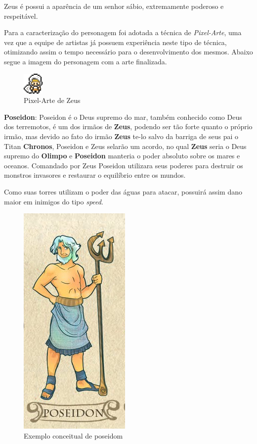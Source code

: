 \documentclass[11pt]{article} %
\begin{document}
Zeus é possui a aparência de um senhor sábio, extremamente poderoso e respeitável.

Para a caracterização do personagem foi adotada a técnica de \textit{Pixel-Arte}, uma vez que a equipe de artistas já possuem experiência neste tipo de técnica, otimizando  assim o tempo necessário para o desenvolvimento dos mesmos. Abaixo segue a imagem do personagem com a arte finalizada.

\begin{figure}[!htp]
\centering
\includegraphics[scale=2]{res/characters/zeus_panel.png}
\caption{Pixel-Arte de Zeus}
\label{zeus}
\end{figure}

\newpage

{\large \textbf{Poseidon}}: Poseidon é o Deus supremo do mar, também conhecido como Deus dos terremotos, é um dos irmãos de \textbf{Zeus}, podendo ser tão forte quanto o próprio irmão, mas devido ao fato do irmão \textbf{Zeus} te-lo salvo da barriga de seus pai o Titan \textbf{Chronos}, Poseidon e Zeus selarão um acordo, no qual \textbf{Zeus} seria o Deus supremo do \textbf{Olimpo} e \textbf{Poseidon} manteria o poder absoluto sobre os mares e oceanos. Comandado por Zeus Poseidon utilizara seus poderes para destruir os monstros invasores e restaurar o equilíbrio entre os mundos.

Como suas torres utilizam o poder das águas para atacar, possuirá assim dano maior em  inimigos do tipo \textit{speed}.

\begin{figure}[!htp]
\centering
\includegraphics[scale=0.25]{res/characters/poseidom.png}
\caption{Exemplo conceitual de poseidom}
\label{poseidom}
\end{figure}
\end{document}
